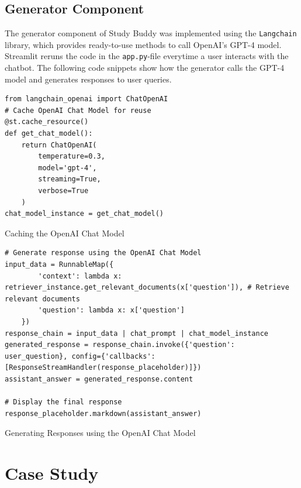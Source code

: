     \subsection{Generator Component}
        The generator component of Study Buddy was implemented using the \texttt{Langchain} library, which provides ready-to-use methods to call OpenAI's GPT-4 model. Streamlit reruns the code in the \texttt{app.py}-file everytime a user interacts with the chatbot. The following code snippets show how the generator calls the GPT-4 model and generates responses to user queries.
        \begin{listing}[H]
\begin{verbatim}
from langchain_openai import ChatOpenAI
# Cache OpenAI Chat Model for reuse
@st.cache_resource()
def get_chat_model():
    return ChatOpenAI(
        temperature=0.3,
        model='gpt-4',
        streaming=True,
        verbose=True
    )
chat_model_instance = get_chat_model()
\end{verbatim}
            \caption{Caching the OpenAI Chat Model}
            \label{listing:Cache_Chat_Model}
            \end{listing}
            
            \begin{listing}[H]
\begin{verbatim}
# Generate response using the OpenAI Chat Model
input_data = RunnableMap({
        'context': lambda x: retriever_instance.get_relevant_documents(x['question']), # Retrieve relevant documents
        'question': lambda x: x['question']
    })
response_chain = input_data | chat_prompt | chat_model_instance
generated_response = response_chain.invoke({'question': user_question}, config={'callbacks': [ResponseStreamHandler(response_placeholder)]})
assistant_answer = generated_response.content

# Display the final response
response_placeholder.markdown(assistant_answer)
\end{verbatim}
            \caption{Generating Responses using the OpenAI Chat Model}
            \label{listing:Generate_Responses}
            \end{listing}
            


\section{Case Study}

